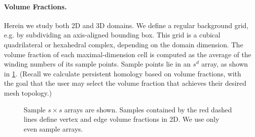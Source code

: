\paragraph{Volume Fractions.}
Herein we study both 2D and 3D domains.
We define a regular background grid, e.g. by subdividing an axis-aligned bounding box.
This grid is a cubical quadrilateral or hexahedral complex, depending on the domain dimension.
The volume fraction of each maximal-dimension cell is computed as the average of the winding numbers of its sample points.
Sample points lie in an $s^d$ array, as shown in \cref{fig:subcell_pts}.  
(Recall we calculate persistent homology based on volume fractions, with the goal that the user may select the volume fraction that achieves their desired mesh topology.)

\begin{figure}[!htb]
\centering
{}
\caption{Sample $s \times s$ arrays are shown. Samples contained by the red dashed lines define vertex and edge volume fractions in 2D. We use only even sample arrays.}
\label{fig:subcell_pts}
\end{figure}


